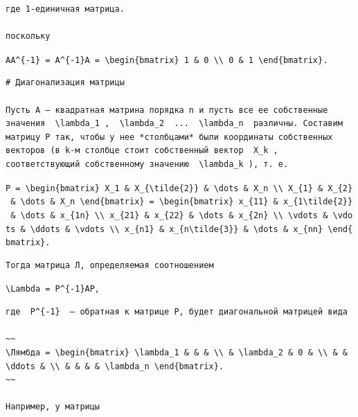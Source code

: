 \documentclass[
  ukrainian,
]{article}
\begin{document}
\begin{verbatim}
где 1-единичная матрица.

поскольку
\end{verbatim}

\texttt{AA\^{}\{-1\}\ =\ A\^{}\{-1\}A\ =\ \textbackslash{}begin\{bmatrix\}\ 1\ \&\ 0\ \textbackslash{}\textbackslash{}\ 0\ \&\ 1\ \textbackslash{}end\{bmatrix\}.}

\begin{verbatim}
# Диагонализация матрицы

Пусть A — квадратная матрина порядка n и пусть все ее собственные значения  \lambda_1 ,  \lambda_2  ...  \lambda_n  различны. Составим матрицу P так, чтобы у нее *столбцами* были координаты собственных векторов (в k-м столбце стоит собственный вектор  X_k , соответствующий собственному значению  \lambda_k ), т. е.
\end{verbatim}

\texttt{P\ =\ \textbackslash{}begin\{bmatrix\}\ X\_1\ \&\ X\_\{\textbackslash{}tilde\{2\}\}\ \&\ \textbackslash{}dots\ \&\ X\_n\ \textbackslash{}\textbackslash{}\ X\_\{1\}\ \&\ X\_\{2\}\ \&\ \textbackslash{}dots\ \&\ X\_n\ \textbackslash{}end\{bmatrix\}\ =\ \textbackslash{}begin\{bmatrix\}\ x\_\{11\}\ \&\ x\_\{1\textbackslash{}tilde\{2\}\}\ \&\ \textbackslash{}dots\ \&\ x\_\{1n\}\ \textbackslash{}\textbackslash{}\ x\_\{21\}\ \&\ x\_\{22\}\ \&\ \textbackslash{}dots\ \&\ x\_\{2n\}\ \textbackslash{}\textbackslash{}\ \textbackslash{}vdots\ \&\ \textbackslash{}vdots\ \&\ \textbackslash{}ddots\ \&\ \textbackslash{}vdots\ \textbackslash{}\textbackslash{}\ x\_\{n1\}\ \&\ x\_\{n\textbackslash{}tilde\{3\}\}\ \&\ \textbackslash{}dots\ \&\ x\_\{nn\}\ \textbackslash{}end\{bmatrix\}.}

\begin{verbatim}
Тогда матрица Л, определяемая соотношением
\end{verbatim}

\texttt{\textbackslash{}Lambda\ =\ P\^{}\{-1\}AP,}

\begin{verbatim}
где  P^{-1}  — обратная к матрице P, будет диагональной матрицей вида

~~
\Лямбда = \begin{bmatrix} \lambda_1 & & & \\ & \lambda_2 & 0 & \\ & & \ddots & \\ & & & & \lambda_n \end{bmatrix}.
~~

Например, у матрицы
\end{verbatim}
\end{document}
